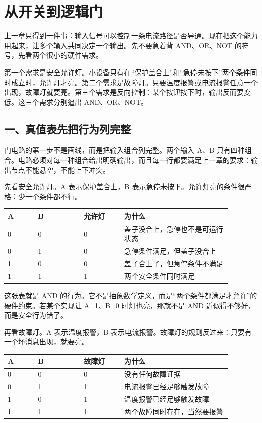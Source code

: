 \chapter{从开关到逻辑门}

上一章只得到一件事：输入信号可以控制一条电流路径是否导通。现在把这个能力用起来，让多个输入共同决定一个输出。先不要急着背 AND、OR、NOT 的符号，先看两个很小的硬件需求。

第一个需求是安全允许灯。小设备只有在“保护盖合上”和“急停未按下”两个条件同时成立时，允许灯才亮。第二个需求是故障灯。只要温度报警或电流报警任意一个出现，故障灯就要亮。第三个需求是反向控制：某个按钮按下时，输出反而要变低。这三个需求分别逼出 AND、OR、NOT。

\section{一、真值表先把行为列完整}

门电路的第一步不是画线，而是把输入组合列完整。两个输入 A、B 只有四种组合。电路必须对每一种组合给出明确输出，而且每一行都要满足上一章的要求：输出节点不能悬空，不能上下冲突。

先看安全允许灯。A 表示保护盖合上，B 表示急停未按下。允许灯亮的条件很严格：少一个条件都不行。

\begin{longtable}{p{0.12\linewidth}p{0.18\linewidth}p{0.16\linewidth}p{0.42\linewidth}}
\toprule
A & B & 允许灯 & 为什么 \\
\midrule
0 & 0 & 0 & 盖子没合上，急停也不是可运行状态 \\
0 & 1 & 0 & 急停条件满足，但盖子没合上 \\
1 & 0 & 0 & 盖子合上了，但急停条件不满足 \\
1 & 1 & 1 & 两个安全条件同时满足 \\
\bottomrule
\end{longtable}

这张表就是 AND 的行为。它不是抽象数学定义，而是“两个条件都满足才允许”的硬件约束。若某个实现让 A=1、B=0 时灯也亮，那就不是 AND 近似得不够好，而是安全行为错了。

再看故障灯。A 表示温度报警，B 表示电流报警。故障灯的规则反过来：只要有一个坏消息出现，就要亮。

\begin{longtable}{p{0.12\linewidth}p{0.18\linewidth}p{0.16\linewidth}p{0.42\linewidth}}
\toprule
A & B & 故障灯 & 为什么 \\
\midrule
0 & 0 & 0 & 没有任何故障证据 \\
0 & 1 & 1 & 电流报警已经足够触发故障 \\
1 & 0 & 1 & 温度报警已经足够触发故障 \\
1 & 1 & 1 & 两个故障同时存在，当然要报警 \\
\bottomrule
\end{longtable}

